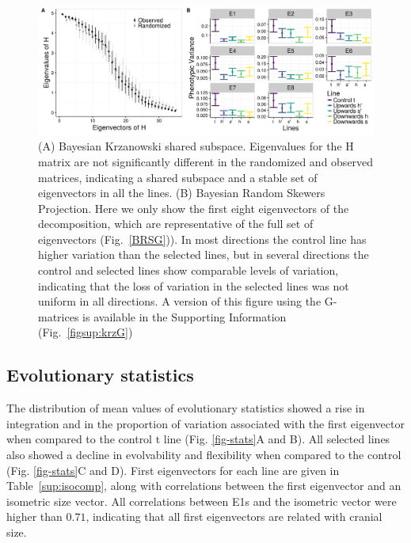 \begin{refsection}
\begin{figure}
    \centering
    \includegraphics[width=\textwidth]{chapter_ratones/media/figure2.png}
    \caption[Matrix comparisons between selected and control lines]{(A) Bayesian Krzanowski
shared subspace. Eigenvalues for the H matrix are not significantly
different in the randomized and observed matrices, indicating a shared
subspace and a stable set of eigenvectors in all the lines. (B) Bayesian
Random Skewers Projection. Here we only show the first eight
eigenvectors of the decomposition, which are representative of the full
set of eigenvectors (Fig.~\ref{BRSG})). In most directions the control line has
higher variation than the selected lines, but in several directions the
control and selected lines show comparable levels of variation,
indicating that the loss of variation in the selected lines was not
uniform in all directions. A version of this figure using the G-matrices
is available in the Supporting Information (Fig.~\ref{figsup:krzG})}
    \label{fig-comparisons}
\end{figure}

\subsection{Evolutionary statistics}

The distribution of mean values of evolutionary statistics showed a rise
in integration and in the proportion of variation associated with the
first eigenvector when compared to the control t line (Fig.
\ref{fig-stats}A and B). All selected lines also showed a decline in
evolvability and flexibility when compared to the control (Fig.
\ref{fig-stats}C and D). First eigenvectors for each line are given in
Table~\ref{sup:isocomp}, along with correlations between the first eigenvector and an
isometric size vector. All correlations between E1s and the isometric
vector were higher than \(0.71\), indicating that all first eigenvectors
are related with cranial size.


\end{refsection}
